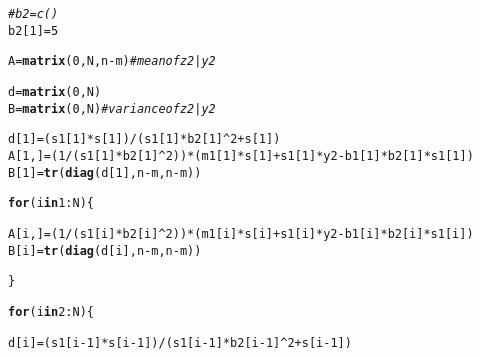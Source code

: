 \documentclass{article}\usepackage[]{graphicx}\usepackage[]{color}
\makeatletter
\newcommand{\hlnum}[1]{\textcolor[rgb]{0.686,0.059,0.569}{#1}}%
\newcommand{\hlcom}[1]{\textcolor[rgb]{0.678,0.584,0.686}{\textit{#1}}}%
\newcommand{\hlopt}[1]{\textcolor[rgb]{0,0,0}{#1}}%
\newcommand{\hlstd}[1]{\textcolor[rgb]{0.345,0.345,0.345}{#1}}%
\newcommand{\hlkwa}[1]{\textcolor[rgb]{0.161,0.373,0.58}{\textbf{#1}}}%
\newcommand{\hlkwb}[1]{\textcolor[rgb]{0.69,0.353,0.396}{#1}}%
\newcommand{\hlkwd}[1]{\textcolor[rgb]{0.737,0.353,0.396}{\textbf{#1}}}%
\newenvironment{kframe}{%
 \def\at@end@of@kframe{}%
 \ifinner\ifhmode%
  \def\at@end@of@kframe{\end{minipage}}%
  \begin{minipage}{\columnwidth}%
 \fi\fi%
 \def\FrameCommand##1{\hskip\@totalleftmargin \hskip-\fboxsep
 \colorbox{shadecolor}{##1}\hskip-\fboxsep
     \hskip-\linewidth \hskip-\@totalleftmargin \hskip\columnwidth}%
 \MakeFramed {\advance\hsize-\width
   \@totalleftmargin\z@ \linewidth\hsize
   \@setminipage}}%
 {\par\unskip\endMakeFramed%
 \at@end@of@kframe}
\newenvironment{knitrout}{}{} %
\makeatother
\begin{document}
\begin{knitrout}
\begin{kframe}
\begin{alltt}
\hlcom{#b2=c()}
\hlstd{b2[}\hlnum{1}\hlstd{]}\hlkwb{=}\hlnum{5}

\hlstd{A}\hlkwb{=}\hlkwd{matrix}\hlstd{(}\hlnum{0}\hlstd{,N,n}\hlopt{-}\hlstd{m)}   \hlcom{#mean of z2|y2}

\hlstd{d}\hlkwb{=}\hlkwd{matrix}\hlstd{(}\hlnum{0}\hlstd{,N)}
\hlstd{B}\hlkwb{=}\hlkwd{matrix}\hlstd{(}\hlnum{0}\hlstd{,N)}  \hlcom{# variance of z2|y2}

\hlstd{d[}\hlnum{1}\hlstd{]}\hlkwb{=}\hlstd{(s1[}\hlnum{1}\hlstd{]}\hlopt{*}\hlstd{s[}\hlnum{1}\hlstd{])}\hlopt{/}\hlstd{(s1[}\hlnum{1}\hlstd{]}\hlopt{*}\hlstd{b2[}\hlnum{1}\hlstd{]}\hlopt{^}\hlnum{2}\hlopt{+}\hlstd{s[}\hlnum{1}\hlstd{])}
\hlstd{A[}\hlnum{1}\hlstd{,]}\hlkwb{=}\hlstd{(}\hlnum{1}\hlopt{/}\hlstd{(s1[}\hlnum{1}\hlstd{]}\hlopt{*}\hlstd{b2[}\hlnum{1}\hlstd{]}\hlopt{^}\hlnum{2}\hlstd{))}\hlopt{*}\hlstd{(m1[}\hlnum{1}\hlstd{]}\hlopt{*}\hlstd{s[}\hlnum{1}\hlstd{]}\hlopt{+}\hlstd{s1[}\hlnum{1}\hlstd{]}\hlopt{*}\hlstd{y2}\hlopt{-}\hlstd{b1[}\hlnum{1}\hlstd{]}\hlopt{*}\hlstd{b2[}\hlnum{1}\hlstd{]}\hlopt{*}\hlstd{s1[}\hlnum{1}\hlstd{])}
\hlstd{B[}\hlnum{1}\hlstd{]}\hlkwb{=}\hlkwd{tr}\hlstd{(}\hlkwd{diag}\hlstd{(d[}\hlnum{1}\hlstd{],n}\hlopt{-}\hlstd{m,n}\hlopt{-}\hlstd{m))}
\end{alltt}


{\ttfamily\noindent\bfseries{}}\begin{alltt}
\hlkwa{for} \hlstd{(i} \hlkwa{in} \hlnum{1}\hlopt{:}\hlstd{N)\{}

  \hlstd{A[i,]}\hlkwb{=}\hlstd{(}\hlnum{1}\hlopt{/}\hlstd{(s1[i]}\hlopt{*}\hlstd{b2[i]}\hlopt{^}\hlnum{2}\hlstd{))}\hlopt{*}\hlstd{(m1[i]}\hlopt{*}\hlstd{s[i]}\hlopt{+}\hlstd{s1[i]}\hlopt{*}\hlstd{y2}\hlopt{-}\hlstd{b1[i]}\hlopt{*}\hlstd{b2[i]}\hlopt{*}\hlstd{s1[i])}
  \hlstd{B[i]}\hlkwb{=}\hlkwd{tr}\hlstd{(}\hlkwd{diag}\hlstd{(d[i],n}\hlopt{-}\hlstd{m,n}\hlopt{-}\hlstd{m))}

\hlstd{\}}
\end{alltt}


{\ttfamily\noindent\bfseries{}}\begin{alltt}
\hlkwa{for}\hlstd{(i} \hlkwa{in} \hlnum{2}\hlopt{:}\hlstd{N)\{}

  \hlstd{d[i]}\hlkwb{=}\hlstd{(s1[i}\hlopt{-}\hlnum{1}\hlstd{]}\hlopt{*}\hlstd{s[i}\hlopt{-}\hlnum{1}\hlstd{])}\hlopt{/}\hlstd{(s1[i}\hlopt{-}\hlnum{1}\hlstd{]}\hlopt{*}\hlstd{b2[i}\hlopt{-}\hlnum{1}\hlstd{]}\hlopt{^}\hlnum{2}\hlopt{+}\hlstd{s[i}\hlopt{-}\hlnum{1}\hlstd{])}


\end{alltt}
\end{kframe}
\end{knitrout}
\end{document}
